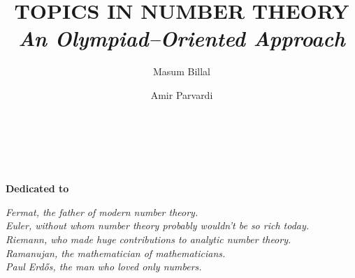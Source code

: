 \documentclass[leqno,12pt]{book}
\title{\bf\Huge TOPICS IN NUMBER THEORY\\ {\vspace*{.3in}\it\LARGE An Olympiad--Oriented Approach}\\\vspace*{.3in}{\Large Second Edition\\\vspace*{.1in}\rule{\textwidth}{0.8pt}}}
\author{
	\sc \Huge Masum Billal
	\and \sc \Huge Amir Parvardi\\\vspace*{.4in}
	\rule{\textwidth}{0.8pt}\\\vspace*{.2in}
}
\date{}
\begin{document}
\frontmatter
\pagestyle{empty}


\maketitle
\pagestyle{empty}

\begin{dedication}
	\begin{center}
		\textbf{Dedicated to}
	\end{center}\slshape
	Fermat, the father of modern number theory.\\
	Euler, without whom number theory probably wouldn't be so rich today.\\
	Riemann, who made huge contributions to analytic number theory.\\
	Ramanujan, the mathematician of mathematicians.\\
	Paul Erd\H{o}s, the man who loved only numbers.
\end{dedication}
\end{document}
